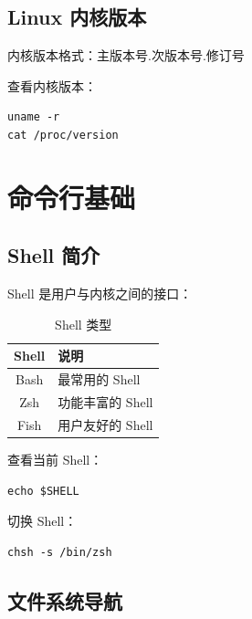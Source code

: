 \documentclass[12pt,UTF8]{ctexbook}
\begin{document}
\section{Linux 内核版本}
\label{sec:kernel_version}

内核版本格式：主版本号.次版本号.修订号

查看内核版本：
\begin{verbatim}
uname -r
cat /proc/version
\end{verbatim}

\chapter{命令行基础}
\label{chap:command_line}

\section{Shell 简介}
\label{sec:shell_intro}

Shell 是用户与内核之间的接口：
\begin{table}[htbp]
    \centering
    \caption{Shell 类型}
    \begin{tabular}{|c|p{8cm}|}
        \hline
        \textbf{Shell} & \textbf{说明} \\
        \hline
        Bash & 最常用的 Shell \\
        \hline
        Zsh & 功能丰富的 Shell \\
        \hline
        Fish & 用户友好的 Shell \\
        \hline
    \end{tabular}
\end{table}

查看当前 Shell：
\begin{verbatim}
echo $SHELL
\end{verbatim}

切换 Shell：
\begin{verbatim}
chsh -s /bin/zsh
\end{verbatim}

\section{文件系统导航}
\label{sec:file_navigation}
\end{document}
